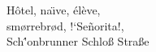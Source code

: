 
H\^otel, na\"\i ve, \'el\`eve,\\
sm\o rrebr\o d, !`Se\~norita!,\\
Sch\''onbrunner Schlo\ss{}
Stra\ss e

